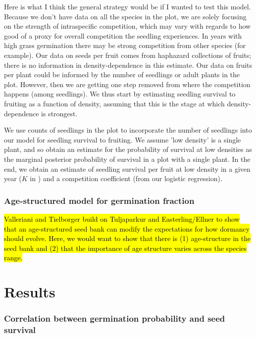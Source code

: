 \documentclass[12pt, oneside, titlepage]{article}   	%
\begin{document}
{{Here is what I think the general strategy would be if I wanted to test this model. Because we don't have data on all the species in the plot, we are solely focusing on the strength of intraspecific competition, which may vary with regards to how good of a proxy for overall competition the seedling experiences. In years with high grass germination there may be strong competition from other species (for example). Our data on seeds per fruit comes from haphazard collections of fruits; there is no information in density-dependence in this estimate. Our data on fruits per plant could be informed by the number of seedlings or adult plants in the plot. However, then we are getting one step removed from where the competition happens (among seedlings). We thus start by estimating seedling survival to fruiting as a function of density, assuming that this is the stage at which density-dependence is strongest. 

We use counts of seedlings in the plot to incorporate the number of seedlings into our model for seedling survival to fruiting. We assume 'low density' is a single plant, and so obtain an estimate for the probability of survival at low densities as the marginal posterior probability of survival in a plot with a single plant. In the end, we obtain an estimate of seedling survival per fruit at low density in a given year ($K$ in \cite{gremer2014}) and a competition coefficient (from our logistic regression).}

\subsubsection*{Age-structured model for germination fraction}

\hl{Valleriani and Tielborger build on Tuljaparkur and Easterling/Ellner to show that an age-structured seed bank can modify the expectations for how dormancy should evolve. Here, we would want to show that there is (1) age-structure in the seed bank and (2) that the importance of age structure varies across the species range.}
\fi

\section*{Results}

\subsubsection*{Correlation between germination probability and seed survival}

}
\end{document}
